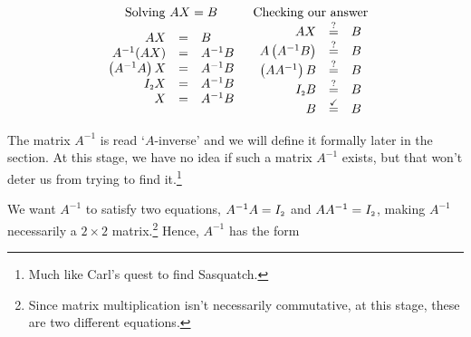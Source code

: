 \documentclass{ximera}
\begin{document}
\[ \begin{array}{cc}  

\text{Solving $AX = B$} & \text{Checking our answer} \\

\begin{array}{rcl}

AX & = & B \\

A^{-1}(AX) & = & A^{-1}B \\

\left(A^{-1}A\right) X & = & A^{-1}B \\

I_{\mbox{\tiny$2$}}X & = & A^{-1}B \\

X & = & A^{-1}B \\

\end{array} 

&

\begin{array}{rcl}

AX & \stackrel{?}{=} & B \\

A \left(A^{-1}B\right) & \stackrel{?}{=} & B \\

\left(AA^{-1}\right) B & \stackrel{?}{=}& B \\

I_{\mbox{\tiny$2$}}B & \stackrel{?}{=} & B \\

B & \stackrel{\checkmark}{=}& B \\

\end{array} \\

\end{array}\]

 \label{solvingmatrixeqn}

The matrix $A^{-1}$ is read `$A$-inverse' and we will define it formally later in the section. At this stage, we have no idea if such a matrix $A^{-1}$ exists, but that won't deter us from trying to find it.\footnote{Much like Carl's quest to find Sasquatch.} 

We want $A^{-1}$ to satisfy two equations, $A^{-1}A = I_{\mbox{\tiny$2$}}$ and $AA^{-1} = I_{\mbox{\tiny$2$}}$, making $A^{-1}$ necessarily a $2 \times 2$ matrix.\footnote{Since matrix multiplication isn't necessarily commutative, at this stage, these are two different equations.}  Hence,  $A^{-1}$ has the form 
\end{document}
